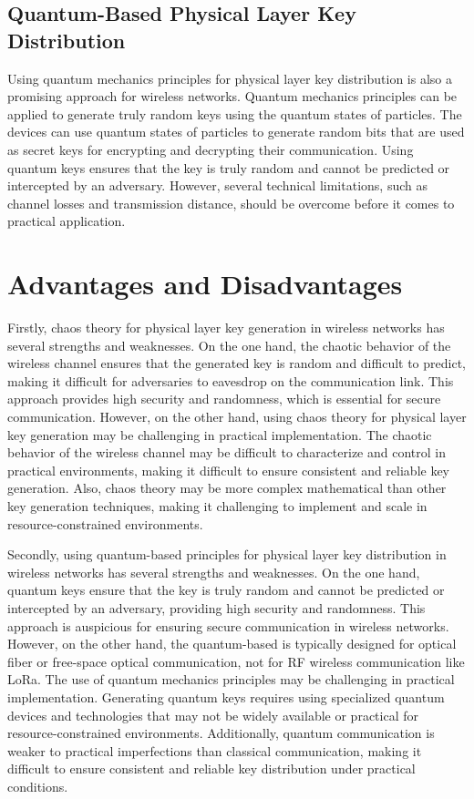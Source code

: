 \subsection{Quantum-Based Physical Layer Key Distribution}
Using quantum mechanics principles for physical layer key distribution is also a promising approach for wireless networks. Quantum mechanics principles can be applied to generate truly random keys using the quantum states of particles. The devices can use quantum states of particles to generate random bits that are used as secret keys for encrypting and decrypting their communication. Using quantum keys ensures that the key is truly random and cannot be predicted or intercepted by an adversary. However, several technical limitations, such as channel losses and transmission distance, should be overcome before it comes to practical application.

\section{Advantages and Disadvantages}
Firstly, chaos theory for physical layer key generation in wireless networks has several strengths and weaknesses. On the one hand, the chaotic behavior of the wireless channel ensures that the generated key is random and difficult to predict, making it difficult for adversaries to eavesdrop on the communication link. This approach provides high security and randomness, which is essential for secure communication. However, on the other hand, using chaos theory for physical layer key generation may be challenging in practical implementation. The chaotic behavior of the wireless channel may be difficult to characterize and control in practical environments, making it difficult to ensure consistent and reliable key generation. Also, chaos theory may be more complex mathematical than other key generation techniques, making it challenging to implement and scale in resource-constrained environments.

Secondly, using quantum-based principles for physical layer key distribution in wireless networks has several strengths and weaknesses. On the one hand, quantum keys ensure that the key is truly random and cannot be predicted or intercepted by an adversary, providing high security and randomness. This approach is auspicious for ensuring secure communication in wireless networks. However, on the other hand, the quantum-based is typically designed for optical fiber or free-space optical communication, not for RF wireless communication like LoRa. The use of quantum mechanics principles may be challenging in practical implementation. Generating quantum keys requires using specialized quantum devices and technologies that may not be widely available or practical for resource-constrained environments. Additionally, quantum communication is weaker to practical imperfections than classical communication, making it difficult to ensure consistent and reliable key distribution under practical conditions. 


